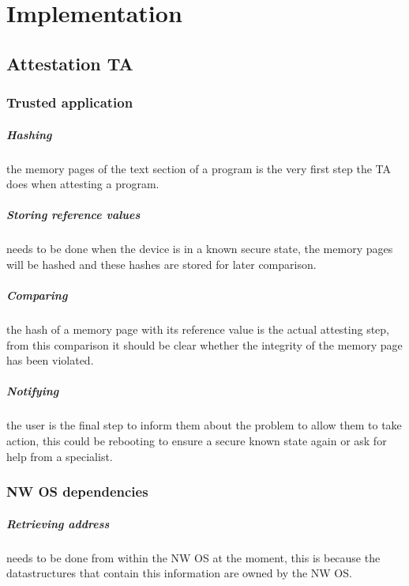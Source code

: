 \documentclass{report}
\begin{document}
\chapter{Implementation}

\section{Attestation TA}

\subsection*{Trusted application}

\paragraph*{Hashing}
the memory pages of the text section of a program is the very first step the TA does when attesting a program.

\paragraph*{Storing reference values}
needs to be done when the device is in a known secure state, the memory pages will be hashed and these hashes are stored for later comparison.

\paragraph*{Comparing}
the hash of a memory page with its reference value is the actual attesting step, from this comparison it should be clear whether the integrity of the memory page has been violated.

\paragraph*{Notifying}
the user is the final step to inform them about the problem to allow them to take action, this could be rebooting to ensure a secure known state again or ask for help from a specialist.

\subsection*{NW OS dependencies}

\paragraph*{Retrieving address}
needs to be done from within the NW OS at the moment, this is because the datastructures that contain this information are owned by the NW OS.
\end{document}
